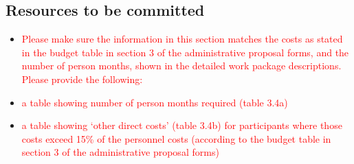 \documentclass[11pt, a4paper]{article} %
\begin{document}
  
  \subsection{Resources to be committed}
 
  \begin{itemize}
  \item \textcolor{red}{Please make sure the information in this
      section matches the costs as stated in the budget table in
      section 3 of the administrative proposal forms, and the number
      of person months, shown in the detailed work package
      descriptions.  Please provide the following:}
 \item \textcolor{red}{a table showing number of person months required
    (table 3.4a)}
  \item \textcolor{red}{a table showing ‘other direct costs’ (table
      3.4b) for participants where those costs exceed 15\% of the
      personnel costs (according to the budget table in section 3 of
      the administrative proposal forms)}
\end{itemize}
\end{document}
